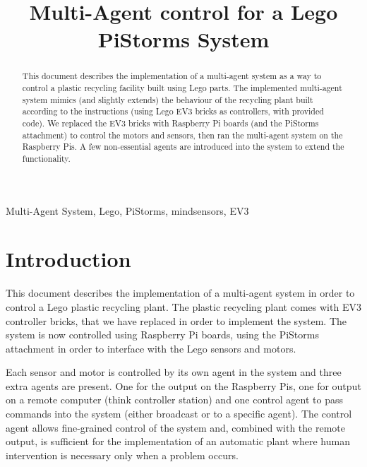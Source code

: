 \documentclass[conference]{IEEEtran}
\begin{document}
\raggedright
\title{Multi-Agent control for a Lego PiStorms System}

\author{
}
\maketitle

\begin{abstract}

This document describes the implementation of a multi-agent system as a way to control a plastic recycling facility built using Lego parts. The implemented multi-agent system mimics (and slightly extends) the behaviour of the recycling plant built according to the instructions (using Lego EV3 bricks as controllers, with provided code). We replaced the EV3 bricks with Raspberry Pi boards (and the PiStorms attachment) to control the motors and sensors, then ran the multi-agent system on the Raspberry Pis. A few non-essential agents are introduced into the system to extend the functionality.

\end{abstract}

\begin{IEEEkeywords}
Multi-Agent System, Lego, PiStorms, mindsensors, EV3
\end{IEEEkeywords}

\section{Introduction}

This document describes the implementation of a multi-agent system in order to control a Lego plastic recycling plant. The plastic recycling plant comes with EV3 controller bricks, that we have replaced in order to implement the system. The system is now controlled using Raspberry Pi boards, using the PiStorms attachment in order to interface with the Lego sensors and motors. 

Each sensor and motor is controlled by its own agent in the system and three extra agents are present. One for the output on the Raspberry Pis, one for output on a remote computer (think controller station) and one control agent to pass commands into the system (either broadcast or to a specific agent). The control agent allows fine-grained control of the system and, combined with the remote output, is sufficient for the implementation of an automatic plant where human intervention is necessary only when a problem occurs.
\end{document}
